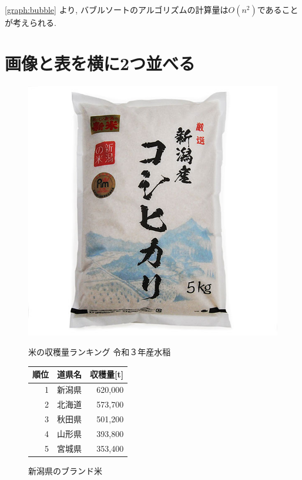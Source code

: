 \documentclass[a4j, titlepage]{jarticle}
\makeatletter
\newcommand{\tblcaption}[1]{\def\@captype{table}\caption{#1}}
\makeatother
\begin{document}
  \ref{graph:bubble} より, バブルソートのアルゴリズムの計算量は$O(n^2)$であることが考えられる.


  \section{画像と表を横に2つ並べる}

  \begin{figure}[htb]
    \begin{minipage}{0.4\textwidth}
      \begin{center}
        \includegraphics[scale=0.2]{koshihikari.jpg}
        \caption{新潟県のブランド米}
        \label{image:koshihikari}
      \end{center}
    \end{minipage}
    \begin{minipage}{0.5\textwidth}
      \begin{center}
        \makeatletter
        \def\@captype{table}
        \makeatother
        \tblcaption{米の収穫量ランキング 令和３年産水稲}
        \label{table:rice}
        \begin{tabular}{|r|l|r|}
          \hline
          順位 & 道県名 & 収穫量[t]\\
          \hline
          \hline
          1 & 新潟県 & 620,000\\ 
          \hline
          2 & 北海道 & 573,700\\ 
          \hline
          3 & 秋田県 & 501,200\\ 
          \hline
          4 & 山形県 & 393,800\\
          \hline
          5 & 宮城県 & 353,400\\
          \hline
        \end{tabular}
      \end{center}
    \end{minipage}
  \end{figure}
\end{document}
